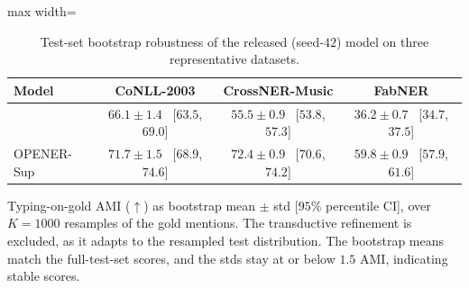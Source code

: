 \begin{table}[tp]
\centering
\caption{Test-set bootstrap robustness of the released (seed-$42$) model on three representative datasets.}
\label{tab:bootstrap}
\small
\begin{adjustbox}{max width=\textwidth}
\begin{threeparttable}
\begin{tabular}{lccc}
\toprule
Model & CoNLL-2003 & CrossNER-Music & FabNER \\
\midrule
\zsind{}   & $66.1 \pm 1.4$ ~[$63.5$, $69.0$] & $55.5 \pm 0.9$ ~[$53.8$, $57.3$] & $36.2 \pm 0.7$ ~[$34.7$, $37.5$] \\
OPENER-Sup & $71.7 \pm 1.5$ ~[$68.9$, $74.6$] & $72.4 \pm 0.9$ ~[$70.6$, $74.2$] & $59.8 \pm 0.9$ ~[$57.9$, $61.6$] \\
\bottomrule
\end{tabular}
\begin{tablenotes}[flushleft]
\footnotesize
\item Typing-on-gold AMI ($\uparrow$) as bootstrap mean $\pm$ std [$95\%$ percentile CI], over $K{=}1000$ resamples of the gold mentions. The transductive refinement is excluded, as it adapts to the resampled test distribution. The bootstrap means match the full-test-set scores, and the stds stay at or below $1.5$ AMI, indicating stable scores.
\end{tablenotes}
\end{threeparttable}
\end{adjustbox}
\end{table}

